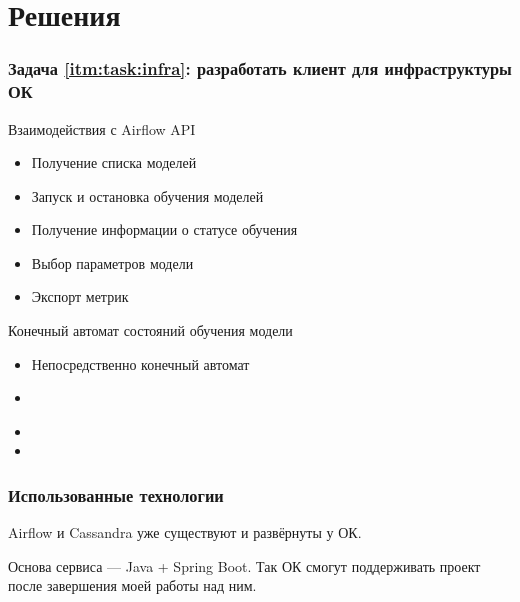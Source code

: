 \section{Решения}

\begin{frame}
\frametitle{Задача \ref{itm:task:infra}: разработать клиент для инфраструктуры ОК}
\begin{block}{Взаимодействия с Airflow API}
    \begin{itemize}
        \item Получение списка моделей
        \item Запуск и остановка обучения моделей
        \item Получение информации о статусе обучения
        \item Выбор параметров модели
        \item Экспорт метрик
    \end{itemize}
\end{block}

\begin{block}{Конечный автомат состояний обучения модели}
    \begin{itemize}
        \item Непосредственно конечный автомат
        \item {}
    \end{itemize}
\end{block}

\begin{block}{}
    \begin{itemize}
        \item {}
        \item {}
    \end{itemize}
\end{block}
\end{frame}

\begin{frame}
\frametitle{Использованные технологии}
Airflow и Cassandra уже существуют и развёрнуты у ОК.

\bigskip

Основа сервиса --- Java + Spring Boot.
Так ОК смогут поддерживать проект после завершения моей работы над ним.
\end{frame}

